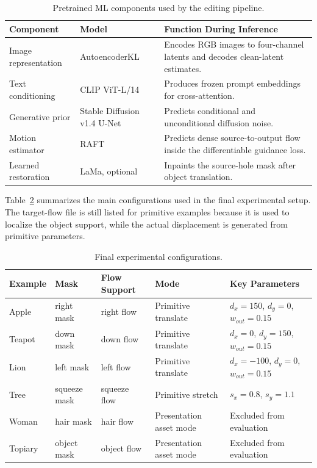 \begin{table}[t]
  \caption{Pretrained ML components used by the editing pipeline.}
  \centering
  \small
  \begin{tabular}{p{1.2in}|p{1.35in}|p{2.45in}}
    \hline
    Component & Model & Function During Inference \\ \hline \hline
    Image representation & AutoencoderKL & Encodes RGB images to four-channel latents and decodes clean-latent estimates. \\ \hline
    Text conditioning & CLIP ViT-L/14 & Produces frozen prompt embeddings for cross-attention. \\ \hline
    Generative prior & Stable Diffusion v1.4 U-Net & Predicts conditional and unconditional diffusion noise. \\ \hline
    Motion estimator & RAFT & Predicts dense source-to-output flow inside the differentiable guidance loss. \\ \hline
    Learned restoration & LaMa, optional & Inpaints the source-hole mask after object translation. \\ \hline
  \end{tabular}
  \label{tab:ml-models}
\end{table}

Table~\ref{tab:experiment-configurations} summarizes the main configurations used in the final experimental setup. The target-flow file is still listed for primitive examples because it is used to localize the object support, while the actual displacement is generated from primitive parameters.

\begin{table}[t]
  \caption{Final experimental configurations.}
  \centering
  \small
  \begin{tabular}{p{0.7in}|p{1.0in}|p{1.0in}|p{1.05in}|p{1.2in}}
    \hline
    Example & Mask & Flow Support & Mode & Key Parameters \\ \hline \hline
    Apple & right mask & right flow & Primitive translate & $d_x=150$, $d_y=0$, $w_{out}=0.15$ \\ \hline
    Teapot & down mask & down flow & Primitive translate & $d_x=0$, $d_y=150$, $w_{out}=0.15$ \\ \hline
    Lion & left mask & left flow & Primitive translate & $d_x=-100$, $d_y=0$, $w_{out}=0.15$ \\ \hline
    Tree & squeeze mask & squeeze flow & Primitive stretch & $s_x=0.8$, $s_y=1.1$ \\ \hline
    Woman & hair mask & hair flow & Presentation asset mode & Excluded from evaluation \\ \hline
    Topiary & object mask & object flow & Presentation asset mode & Excluded from evaluation \\ \hline
  \end{tabular}
  \label{tab:experiment-configurations}
\end{table}

